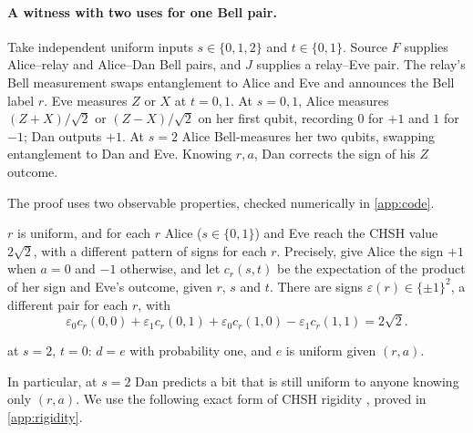 \paragraph{A witness with two uses for one Bell pair.}
Take independent uniform inputs $s\in\{0,1,2\}$ and $t\in\{0,1\}$. Source $F$ supplies Alice--relay
and Alice--Dan Bell pairs, and $J$ supplies a relay--Eve pair. The relay's Bell measurement swaps
entanglement to Alice and Eve and announces the Bell label $r$. Eve measures $Z$ or $X$ at $t=0,1$.
At $s=0,1$, Alice measures $(Z+X)/\sqrt2$ or $(Z-X)/\sqrt2$ on her first qubit, recording
$0$ for $+1$ and $1$ for $-1$; Dan outputs $+1$. At $s=2$ Alice Bell-measures her two qubits, swapping
entanglement to Dan and Eve. Knowing $r,a$, Dan corrects the sign of his $Z$ outcome.

The proof uses two observable properties, checked numerically in \cref{app:code}.
\begin{description}[leftmargin=1.2cm,style=nextline,itemsep=1pt]
\item[(P1)] $r$ is uniform, and for each $r$ Alice ($s\in\{0,1\}$) and Eve reach the CHSH value $2\sqrt2$, with a
  different pattern of signs for each $r$. Precisely, give Alice the sign $+1$ when $a=0$ and $-1$ otherwise, and
  let $c_r(s,t)$ be the expectation of the product of her sign and Eve's outcome, given $r$, $s$ and $t$. There are
  signs $\varepsilon(r)\in\{\pm1\}^2$, a different pair for each $r$, with
  \[\varepsilon_0c_r(0,0)+\varepsilon_1c_r(0,1)+\varepsilon_0c_r(1,0)-\varepsilon_1c_r(1,1)=2\sqrt2 .\]
\item[(P2)] at $s=2$, $t=0$: $d=e$ with probability one, and $e$ is uniform given $(r,a)$.
\end{description}

In particular, at $s=2$ Dan predicts a bit that is still uniform to anyone knowing only $(r,a)$.
We use the following exact form of CHSH rigidity \cite{SW}, proved in \cref{app:rigidity}.

